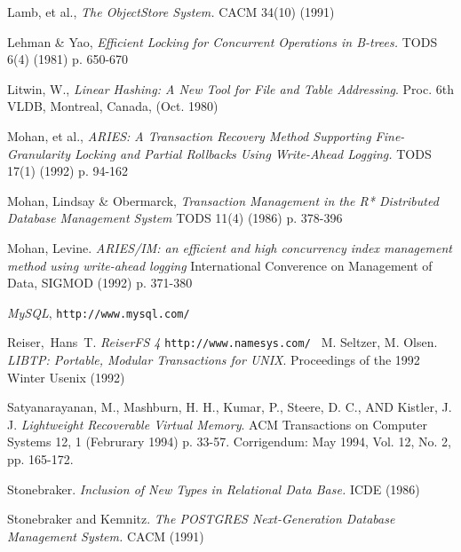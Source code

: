 \documentclass[10pt,letterpaper,twocolumn,english]{article}
\begin{document}
\begin{thebibliography}{99}
\begin{small}
 Lamb, et al., {\em The ObjectStore System.} CACM 34(10) (1991)

 Lehman \& Yao, {\em Efficient Locking for Concurrent Operations in B-trees.} TODS 6(4) (1981) p. 650-670

 Litwin, W., {\em Linear Hashing: A New Tool for File and Table Addressing}. Proc. 6th VLDB, Montreal, Canada, (Oct. 1980) %

 Mohan, et al., {\em ARIES: A Transaction Recovery Method Supporting Fine-Granularity Locking and Partial Rollbacks Using Write-Ahead Logging.} TODS 17(1) (1992) p. 94-162

 Mohan, Lindsay \& Obermarck, {\em Transaction Management in the R* Distributed Database Management System} TODS 11(4) (1986) p. 378-396

 Mohan, Levine. {\em ARIES/IM: an efficient and high concurrency index management method using write-ahead logging} International Converence on Management of Data, SIGMOD (1992) p. 371-380

 {\em MySQL}, {\tt http://www.mysql.com/ }

 Reiser,~Hans~T. {\em ReiserFS 4} {\tt http://www.namesys.com/ }
%
 M. Seltzer, M. Olsen. {\em LIBTP: Portable, Modular Transactions for UNIX}. Proceedings of the 1992 Winter Usenix (1992)

 Satyanarayanan, M., Mashburn, H. H., Kumar, P., Steere, D. C., AND Kistler, J. J. {\em Lightweight Recoverable Virtual Memory}. ACM Transactions on Computer Systems 12, 1 (Februrary 1994) p. 33-57. Corrigendum: May 1994, Vol. 12, No. 2, pp. 165-172.

 Stonebraker. {\em Inclusion of New Types in Relational Data Base. } ICDE (1986) %

 Stonebraker and Kemnitz. {\em The POSTGRES Next-Generation Database Management System. } CACM (1991)

%
%



\end{small}
\end{thebibliography}
\end{document}
